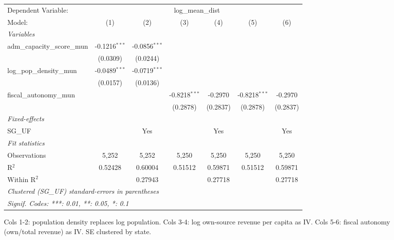 \begingroup
\centering
\begin{tabular}{lcccccc}
   \tabularnewline \midrule \midrule
   Dependent Variable: & \multicolumn{6}{c}{log\_mean\_dist}\\
   Model:                       & (1)             & (2)             & (3)             & (4)      & (5)             & (6)\\  
   \midrule
   \emph{Variables}\\
   adm\_capacity\_score\_mun    & -0.1216$^{***}$ & -0.0856$^{***}$ &                 &          &                 &   \\   
                                & (0.0309)        & (0.0244)        &                 &          &                 &   \\   
   log\_pop\_density\_mun       & -0.0489$^{***}$ & -0.0719$^{***}$ &                 &          &                 &   \\   
                                & (0.0157)        & (0.0136)        &                 &          &                 &   \\   
   fiscal\_autonomy\_mun        &                 &                 & -0.8218$^{***}$ & -0.2970  & -0.8218$^{***}$ & -0.2970\\   
                                &                 &                 & (0.2878)        & (0.2837) & (0.2878)        & (0.2837)\\   
   \midrule
   \emph{Fixed-effects}\\
   SG\_UF                       &                 & Yes             &                 & Yes      &                 & Yes\\  
   \midrule
   \emph{Fit statistics}\\
   Observations                 & 5,252           & 5,252           & 5,250           & 5,250    & 5,250           & 5,250\\  
   R$^2$                        & 0.52428         & 0.60004         & 0.51512         & 0.59871  & 0.51512         & 0.59871\\  
   Within R$^2$                 &                 & 0.27943         &                 & 0.27718  &                 & 0.27718\\  
   \midrule \midrule
   \multicolumn{7}{l}{\emph{Clustered (SG\_UF) standard-errors in parentheses}}\\
   \multicolumn{7}{l}{\emph{Signif. Codes: ***: 0.01, **: 0.05, *: 0.1}}\\
\end{tabular}
 
\par \raggedright 
Cols 1-2: population density replaces log population. Cols 3-4: log own-source revenue per capita as IV. Cols 5-6: fiscal autonomy (own/total revenue) as IV. SE clustered by state.
\par\endgroup
